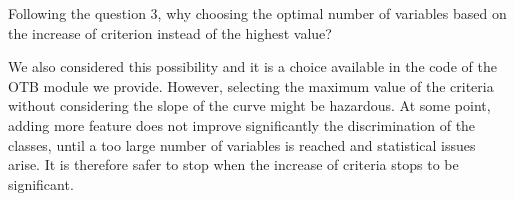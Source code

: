 \documentclass[a4paper,10pt,DIV=16]{scrartcl}
\begin{document}
\begin{revbox}
  Following the question 3, why choosing the optimal number of variables based on the increase of criterion instead of the highest value?
  \begin{resbox}
    We also considered this possibility and it is a choice available in the code of the OTB module we provide. However, selecting the maximum value of the criteria without considering the slope of the curve might be hazardous. At some point, adding more feature does not improve significantly the discrimination of the classes, until a too large number of variables is reached and statistical issues arise. It is therefore safer to stop when the increase of criteria stops to be significant.
\end{resbox}
\end{revbox}

\end{document}

